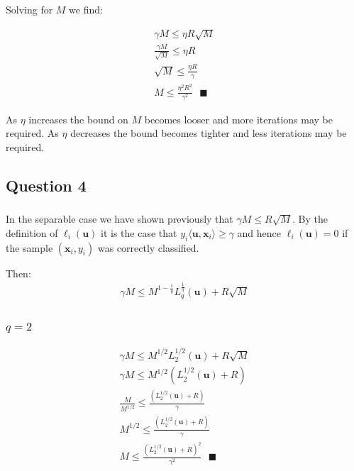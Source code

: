 \documentclass[11pt, oneside]{article}   	%
\begin{document}
Solving for $M$ we find:

\begin{gather*}
\gamma M \leq \eta R \sqrt{M}\\
\frac{\gamma M}{\sqrt{M}} \leq \eta R\\
\sqrt{M} \leq \frac{\eta R}{\gamma}\\
M \leq \frac{\eta^2 R^2}{\gamma^2} \text{ } \blacksquare
\end{gather*}

As $\eta$ increases the bound on $M$ becomes looser and more iterations may be required.  As $\eta$ decreases the bound becomes tighter and less iterations may be required.

\subsection{Question 4}
\subsubsection{}
In the separable case we have shown previously that $\gamma M \leq R \sqrt{M}$.  By the definition of $\ell_i(\boldsymbol{u})$ it is the case that $y_i \langle \boldsymbol{u}, \boldsymbol{x}_i\rangle \geq \gamma$ and hence $\ell_i(\boldsymbol{u}) = 0$ if the sample $(\boldsymbol{x}_i, y_i)$ was correctly classified.

Then:
\begin{gather*}
\gamma M \leq M^{1 - \frac{1}{q}} L_q^{\frac{1}{q}}(\boldsymbol{u}) + R \sqrt{M}
\end{gather*}

\subsubsection{$q = 2$}
\begin{gather*}
\gamma M \leq M^{1/2} L_2^{1/2}(\boldsymbol{u}) + R\sqrt{M}\\
\gamma M \leq M^{1/2} (L_2^{1/2}(\boldsymbol{u}) + R)\\
\frac{M}{M^{1/2} } \leq \frac{(L_2^{1/2}(\boldsymbol{u}) + R)}{\gamma}\\
M^{1/2} \leq \frac{(L_2^{1/2}(\boldsymbol{u}) + R)}{\gamma}\\
M \leq \frac{(L_2^{1/2}(\boldsymbol{u}) + R)^2}{\gamma^2} \text{ } \blacksquare
\end{gather*}

\newpage{}
\end{document}
